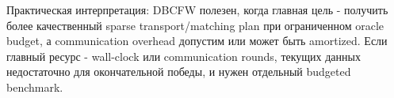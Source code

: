 \documentclass[11pt,a4paper]{article}
\newcommand{\method}[1]{\textsf{#1}}
\begin{document}
Практическая интерпретация: \method{DBCFW} полезен, когда главная цель - получить более качественный sparse transport/matching plan при ограниченном oracle budget, а communication overhead допустим или может быть amortized. Если главный ресурс - wall-clock или communication rounds, текущих данных недостаточно для окончательной победы, и нужен отдельный budgeted benchmark.



\end{document}
